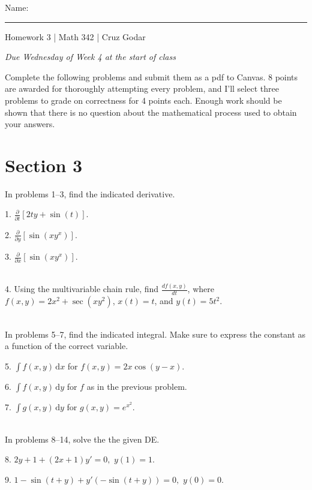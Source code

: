 \documentclass{article}
\begin{document}
\Large Name: \rule{2in}{0.15mm} \hfill Homework 3 | Math 342 | Cruz Godar \vspace{4pt} \normalsize

\textit{Due Wednesday of Week 4 at the start of class}

Complete the following problems and submit them as a pdf to Canvas. 8 points are awarded for thoroughly attempting every problem, and I'll select three problems to grade on correctness for 4 points each. Enough work should be shown that there is no question about the mathematical process used to obtain your answers.

\section{Section 3}

In problems 1--3, find the indicated derivative.

1. $\displaystyle \frac{\partial}{\partial t} \left[ 2ty + \sin(t) \right].$

2. $\displaystyle \frac{\partial}{\partial y} \left[ \sin(xy^x) \right].$

3. $\displaystyle \frac{\partial}{\partial x} \left[ \sin(xy^x) \right].$

~\\

4. Using the multivariable chain rule, find $\displaystyle \frac{d f(x, y)}{dt}$, where $\displaystyle f(x, y) = 2x^2 + \sec(xy^2)$, $x(t) = t$, and $y(t) = 5t^2$.

~\\

In problems 5--7, find the indicated integral. Make sure to express the constant as a function of the correct variable.

5. $\displaystyle \int f(x, y)\,\text{d} x$ for $\displaystyle f(x, y) = 2x\cos(y - x).$

6. $\displaystyle \int f(x, y)\,\text{d} y$ for $f$ as in the previous problem.

7. $\displaystyle \int g(x, y)\,\text{d} y$ for $\displaystyle g(x, y) = e^{x^2}.$

~\\

In problems 8--14, solve the the given DE.

8. $\displaystyle 2y + 1 + (2x + 1)y' = 0,$ $\displaystyle y(1) = 1.$

9. $\displaystyle 1 - \sin(t + y) + y'(-\sin(t + y)) = 0,$ $\displaystyle y(0) = 0.$
\end{document}
